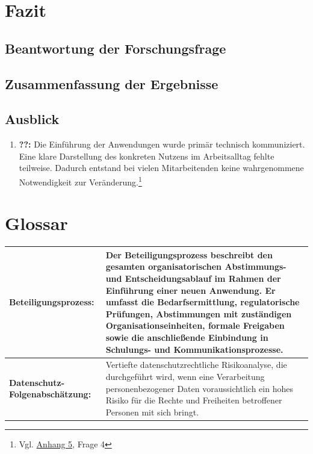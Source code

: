 \documentclass[
    12pt, 
    a4paper,
    ]{scrartcl} %
\begin{document}
\section{Fazit}

\subsection{Beantwortung der Forschungsfrage}

\subsection{Zusammenfassung der Ergebnisse}

\subsection{Ausblick}
\begin{enumerate}
    \setlength\itemsep{0.4\baselineskip}
    \setlength\parskip{0pt}
    \setlength\parsep{0pt}
\item \textbf{??:} Die Einführung der Anwendungen wurde primär technisch kommuniziert. Eine klare Darstellung des konkreten Nutzens im Arbeitsalltag fehlte teilweise. Dadurch entstand bei vielen Mitarbeitenden keine wahrgenommene Notwendigkeit zur Veränderung.\footnote{Vgl. \hyperref[sec:Anhang5]{Anhang 5}, Frage 4}
\end{enumerate}
\section*{Glossar}  
{} 
\vspace{0.6cm}
\begin{tabular}{p{4cm} p{11.35cm}}   
    \textbf{\normalsize Beteiligungsprozess:} & \normalsize Der Beteiligungsprozess beschreibt den gesamten organisatorischen Abstimmungs- und Entscheidungsablauf im Rahmen der Einführung einer neuen Anwendung. Er umfasst die Bedarfsermittlung, regulatorische Prüfungen, Abstimmungen mit zuständigen Organisationseinheiten, formale Freigaben sowie die anschließende Einbindung in Schulungs- und Kommunikationsprozesse.\footnotemark[30]\\[0.5cm]
    \hline
    \textbf{\normalsize Datenschutz-Folgenabschätzung:} & \normalsize Vertiefte datenschutzrechtliche Risikoanalyse, die durchgeführt wird, wenn eine Verarbeitung personenbezogener Daten voraussichtlich ein hohes Risiko für die Rechte und Freiheiten betroffener Personen mit sich bringt.\footnotemark[31]\\[0.5cm]
\end{tabular}
\end{document}
